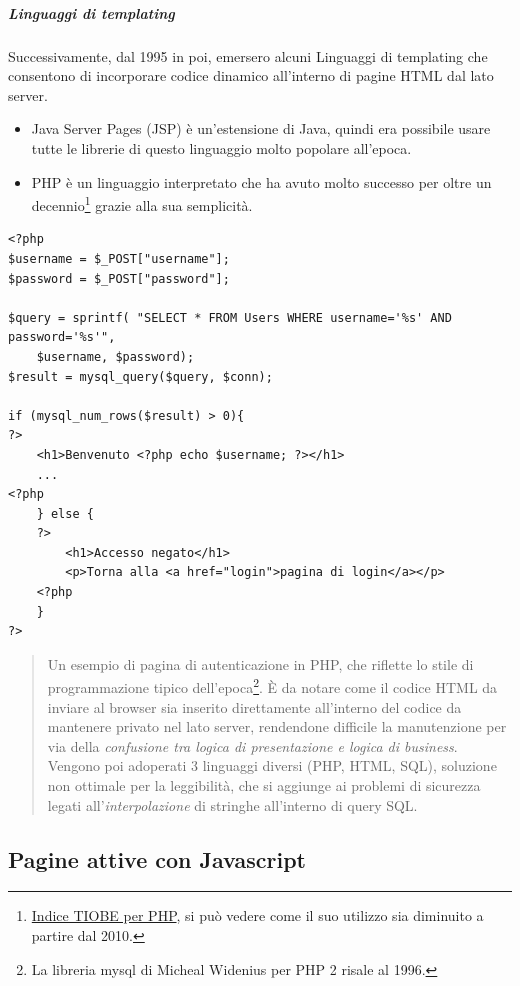 \subparagraph{Linguaggi di templating}\label{linguaggi-di-templating}

Successivamente, dal 1995 in poi, emersero alcuni Linguaggi di
templating che consentono di incorporare codice dinamico all'interno di
pagine HTML dal lato server.

\begin{itemize}
\item
  Java Server Pages (JSP) è un'estensione di Java, quindi era possibile
  usare tutte le librerie di questo linguaggio molto popolare all'epoca.
\item
  PHP è un linguaggio interpretato che ha avuto molto successo per oltre
  un decennio\footnote{\href{https://www.tiobe.com/tiobe-index/php/}{Indice
    TIOBE per PHP}, si può vedere come il suo utilizzo sia diminuito a
    partire dal 2010.} grazie alla sua semplicità.
\end{itemize}

\begin{verbatim}
<?php
$username = $_POST["username"];
$password = $_POST["password"];

$query = sprintf( "SELECT * FROM Users WHERE username='%s' AND password='%s'",
    $username, $password);
$result = mysql_query($query, $conn);

if (mysql_num_rows($result) > 0){
?>
    <h1>Benvenuto <?php echo $username; ?></h1>
    ...
<?php
    } else {
    ?>
        <h1>Accesso negato</h1>
        <p>Torna alla <a href="login">pagina di login</a></p>
    <?php
    }
?>
\end{verbatim}

\begin{quote}
Un esempio di pagina di autenticazione in PHP, che riflette lo stile di
programmazione tipico dell'epoca\footnote{La libreria mysql di Micheal
  Widenius per PHP 2 risale al 1996.}. È da notare come il codice HTML
da inviare al browser sia inserito direttamente all'interno del codice
da mantenere privato nel lato server, rendendone difficile la
manutenzione per via della \emph{confusione tra logica di presentazione
e logica di business}. Vengono poi adoperati 3 linguaggi diversi (PHP,
HTML, SQL), soluzione non ottimale per la leggibilità, che si aggiunge
ai problemi di sicurezza legati all'\emph{interpolazione} di stringhe
all'interno di query SQL.
\end{quote}

\subsection{Pagine attive con
Javascript}\label{pagine-attive-con-javascript}

